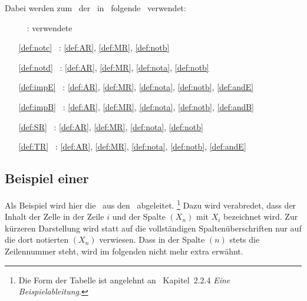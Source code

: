 {Dabei werden zum \Beweis\ der \Schlussregeln\ in~\cite{bib:Rautenberg} folgende \Basisregeln\ verwendet:
\begin{itemize}
	\renewcommand*{\itemindent}{3cm}
	\renewcommand*{\labelsep}{5pt}
	\item[\Schlussregel\ ~:] verwendete \Basisregeln
	\item[\ref{def:notc} ~:] \ref{def:AR}, \ref{def:MR}, \ref{def:notb}
	\item[\ref{def:notd} ~:] \ref{def:AR}, \ref{def:MR}, \ref{def:nota}, \ref{def:notb}
	\item[\ref{def:impE} ~:] \ref{def:AR}, \ref{def:MR}, \ref{def:nota}, \ref{def:notb}, \ref{def:andE}
	\item[\ref{def:impB} ~:] \ref{def:AR}, \ref{def:MR}, \ref{def:nota}, \ref{def:notb}, \ref{def:andB}
	\item[\ref{def:SR}   ~:] \ref{def:AR}, \ref{def:MR}, \ref{def:nota}, \ref{def:notb}
	\item[\ref{def:TR}   ~:] \ref{def:AR}, \ref{def:MR}, \ref{def:nota}, \ref{def:notb}, \ref{def:andE}
\end{itemize}
%
\subsection[Beispiel einer Ableitung]{Beispiel einer \Ableitung}%
\label                           {sub:BeispielAbleitung}

Als Beispiel wird hier die \Schnittregel\ aus den \Basisregeln\ abgeleitet.%
\footnote{%
	Die Form der Tabelle ist angelehnt an~\cite{bib:NatuerlichesSchliessen} Kapitel~2.2.4 \emph{Eine Beispielableitung}.
}
Dazu wird verabredet, dass  der Inhalt der Zelle in der Zeile $i$ und der Spalte $(X_n)$ mit $X_i$ bezeichnet wird.
Zur kürzeren Darstellung wird statt auf die vollständigen Spaltenüberschriften nur auf die dort notierten $(X_n)$ verwiesen. Dass in der Spalte $(n)$ stets die Zeilennummer steht, wird im folgenden nicht mehr extra erwähnt.

}
